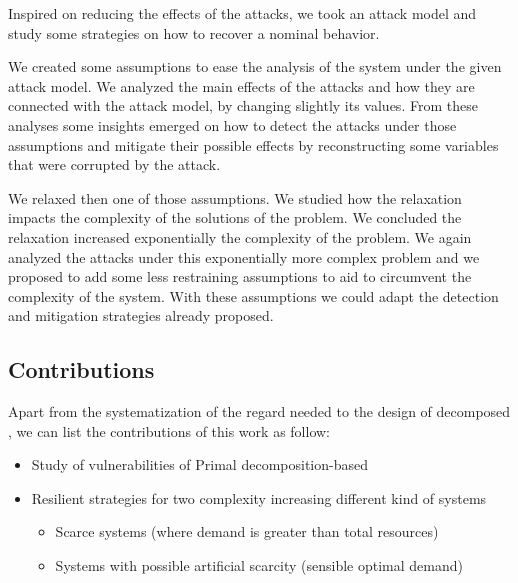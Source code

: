 \documentclass[../main.tex]{subfiles}
\begin{document}
Inspired on reducing the effects of the attacks, we took an attack model and study some strategies on how to recover a nominal behavior.

We created some assumptions to ease the analysis of the system under the given attack model.
We analyzed the main effects of the attacks and how they are connected with the attack model, by changing slightly its values.
From these analyses some insights emerged on how to detect the attacks under those assumptions and mitigate their possible effects by reconstructing some variables that were corrupted by the attack.

We relaxed then one of those assumptions.
We studied how the relaxation impacts the complexity of the solutions of the problem.
We concluded the relaxation increased exponentially the complexity of the problem.
We again analyzed the attacks under this exponentially more complex problem and we proposed to add some less restraining assumptions to aid to circumvent the complexity of the system.
With these assumptions we could adapt the detection and mitigation strategies already proposed.


\subsection{Contributions}
Apart from the systematization of the regard needed to the design of decomposed \cps{}, we can list the contributions of this work as follow:
\begin{itemize}
  \item Study of vulnerabilities of Primal decomposition-based \dmpc{}
  \item Resilient strategies for two complexity increasing different kind of systems
        \begin{itemize}
          \item Scarce systems (where demand is greater than total resources)
          \item Systems with possible artificial scarcity (sensible optimal demand)
        \end{itemize}
\end{itemize}
\end{document}
